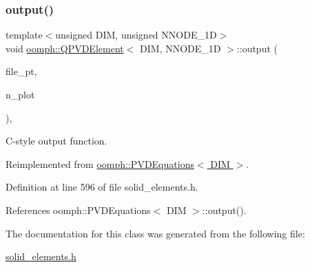 \subsubsection{\texorpdfstring{output()}{output()}\hspace{0.1cm}{\footnotesize\ttfamily [4/4]}}
{\footnotesize\ttfamily template$<$unsigned D\+IM, unsigned N\+N\+O\+D\+E\+\_\+1D$>$ \\
void \hyperlink{classoomph_1_1QPVDElement}{oomph\+::\+Q\+P\+V\+D\+Element}$<$ D\+IM, N\+N\+O\+D\+E\+\_\+1D $>$\+::output (\begin{DoxyParamCaption}\item[{F\+I\+LE $\ast$}]{file\+\_\+pt,  }\item[{const unsigned \&}]{n\+\_\+plot }\end{DoxyParamCaption})\hspace{0.3cm}{\ttfamily [inline]}, {\ttfamily [virtual]}}



C-\/style output function. 



Reimplemented from \hyperlink{classoomph_1_1PVDEquations_ac35042c495411ffc96501d6705b8fa7a}{oomph\+::\+P\+V\+D\+Equations$<$ D\+I\+M $>$}.



Definition at line 596 of file solid\+\_\+elements.\+h.



References oomph\+::\+P\+V\+D\+Equations$<$ D\+I\+M $>$\+::output().



The documentation for this class was generated from the following file\+:\begin{DoxyCompactItemize}
\item 
\hyperlink{solid__elements_8h}{solid\+\_\+elements.\+h}\end{DoxyCompactItemize}
